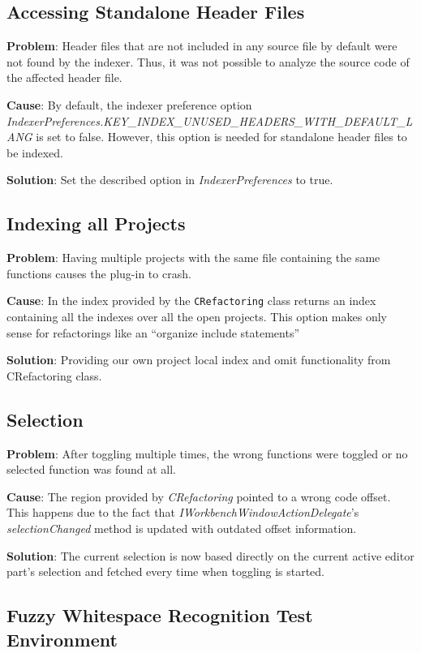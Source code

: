 \subsection{Accessing Standalone Header Files}
\textbf{Problem}: Header files that are not included in any source file by 
default were not found by the indexer. Thus, it was not possible to analyze the 
source code of the affected header file.

\textbf{Cause}: By default, the indexer preference option 
\textit{IndexerPreferences.KEY\_INDEX\_UNUSED\_HEADERS\_WITH\_DEFAULT\_LANG} is 
set to false. However, this option is needed for standalone header files to be 
indexed.

\textbf{Solution}: Set the described option in \textit{IndexerPreferences} to 
true.

\subsection{Indexing all Projects}

\textbf{Problem}: Having multiple projects with the same file containing the
same functions causes the plug-in to crash. 

\textbf{Cause}: In the index provided by the \texttt{CRefactoring} class
returns an index containing all the indexes over all the open projects. This
option makes only sense for refactorings like an ``organize include statements''

\textbf{Solution}: Providing our own project local index and omit functionality
from CRefactoring class.

\subsection{Selection}
\textbf{Problem}: After toggling multiple times, the wrong functions were 
toggled or no selected function was found at all. 

\textbf{Cause}: The region provided by \textit{CRefactoring} pointed to a wrong 
code offset. This happens due to the fact that 
\textit{IWorkbenchWindowActionDelegate}'s \textit{selectionChanged} method is 
updated with outdated offset information.

\textbf{Solution}: The current selection is now based directly on the current 
active editor part's selection and fetched every time when toggling is started.

\subsection{Fuzzy Whitespace Recognition Test Environment}

